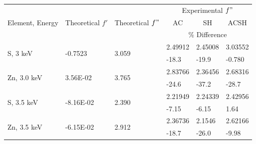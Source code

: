 \vspace{10em}


\begin{table}[H]
{
\begin{tabular}{@{}llllll@{}}
\toprule
\multirow{3}{*}{Element, Energy} &
  \multirow{3}{*}{Theoretical $f'$} &
  \multirow{3}{*}{Theoretical $f"$} &
  \multicolumn{3}{c}{Experimental $f"$} \\
                             &                            &                           & \multicolumn{1}{c}{AC} & \multicolumn{1}{c}{SH} & \multicolumn{1}{c}{ACSH} \\ \cmidrule(l){4-6} 
                             &                            &                           & \multicolumn{3}{c}{\% Difference}                                          \\ \midrule
\multirow{2}{*}{S, 3 \unit{keV}}    & \multirow{2}{*}{-0.7523}  & \multirow{2}{*}{3.059} & 2.49912                & 2.45008                & 3.03552                  \\
                             &                            &                           & -18.3               & -19.9               & -0.780                 \\ \midrule
\multirow{2}{*}{Zn, 3.0 \unit{keV}} & \multirow{2}{*}{3.56E-02}  & \multirow{2}{*}{3.765} & 2.83766                & 2.36456                & 2.68316                  \\
                             &                            &                           & -24.6               & -37.2               & -28.7                 \\ \midrule
\multirow{2}{*}{S, 3.5 \unit{keV}}  & \multirow{2}{*}{-8.16E-02} & \multirow{2}{*}{2.390} & 2.21949                & 2.24339                & 2.42956                  \\
                             &                            &                           & -7.15               & -6.15               & 1.64                 \\ \midrule
\multirow{2}{*}{Zn, 3.5 \unit{keV}}  & \multirow{2}{*}{-6.15E-02} & \multirow{2}{*}{2.912} & 2.36736                & 2.1546                 & 2.62166                  \\
                             &                            &                           & -18.7               & -26.0               & -9.98                 \\ \bottomrule
\end{tabular}%
}


\end{table}
